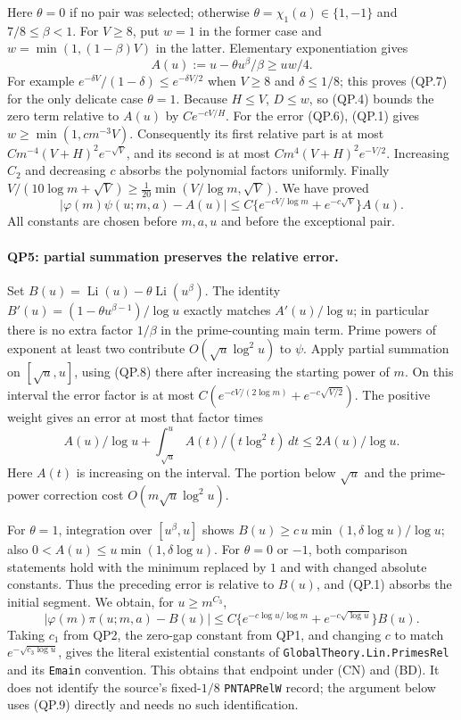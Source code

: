 Here $\theta=0$ if no pair was selected; otherwise
$\theta=\chi_1(a)\in\{1,-1\}$ and $7/8\le\beta<1$.
For $V\ge8$, put $w=1$ in the former case and
$w=\min(1,(1-\beta)V)$ in the latter.  Elementary exponentiation gives
\[
 A(u):=u-\theta u^\beta/\beta\ge uw/4.                \tag{QP.7}
\]
For example $e^{-\delta V}/(1-\delta)\le e^{-\delta V/2}$
when $V\ge8$ and $\delta\le1/8$; this proves (QP.7) for the only delicate
case $\theta=1$.
Because $H\le V$, $D\le w$, so (QP.4) bounds the zero term relative to
$A(u)$ by $Ce^{-cV/H}$.
For the error (QP.6), (QP.1) gives $w\ge\min(1,c m^{-3}V)$.
Consequently its first relative part is at most
$C m^{-4}(V+H)^2e^{-\sqrt V}$, and its second is at most
$C m^4(V+H)^2e^{-V/2}$.  Increasing $C_2$ and decreasing $c$ absorbs
the polynomial factors uniformly.  Finally
$V/(10\log m+\sqrt V)\ge\frac1{20}\min(V/\log m,\sqrt V)$.
We have proved
\[
 |\varphi(m)\psi(u;m,a)-A(u)|
 \le C\{e^{-cV/\log m}+e^{-c\sqrt V}\}A(u).           \tag{QP.8}
\]
All constants are chosen before $m,a,u$ and before the exceptional pair.

\paragraph{QP5: partial summation preserves the relative error.}
Set $B(u)=\operatorname{Li}(u)-\theta\operatorname{Li}(u^\beta)$.
The identity $B'(u)=(1-\theta u^{\beta-1})/\log u$ exactly matches
$A'(u)/\log u$; in particular there is no extra factor $1/\beta$ in
the prime-counting main term.  Prime powers of exponent at least two
contribute $O(\sqrt u\log^2u)$ to $\psi$.
Apply partial summation on $[\sqrt u,u]$, using (QP.8) there after
increasing the starting power of $m$.  On this interval the error factor
is at most $C(e^{-cV/(2\log m)}+e^{-c\sqrt{V/2}})$.
The positive weight gives an error at most that factor times
\[
 A(u)/\log u+\int_{\sqrt u}^{u}A(t)/(t\log^2t)\,dt
                                  \le 2A(u)/\log u.
\]
Here $A(t)$ is increasing on the interval.  The portion below $\sqrt u$
and the prime-power correction cost $O(m\sqrt u\log^2u)$.

For $\theta=1$, integration over $[u^\beta,u]$ shows
$B(u)\ge c\,u\min(1,\delta\log u)/\log u$;
also $0<A(u)\le u\min(1,\delta\log u)$.
For $\theta=0$ or $-1$, both comparison statements hold with the minimum
replaced by $1$ and with changed absolute constants.  Thus the preceding
error is relative to $B(u)$, and (QP.1) absorbs the initial segment.
We obtain, for $u\ge m^{C_3}$,
\[
 |\varphi(m)\pi(u;m,a)-B(u)|
 \le C\{e^{-c\log u/\log m}+e^{-c\sqrt{\log u}}\}B(u).
                                                               \tag{QP.9}
\]
Taking $c_1$ from QP2, the zero-gap constant from QP1, and changing $c$
to match $e^{-\sqrt{c_3\log u}}$, gives the literal existential constants
of \texttt{GlobalTheory.Lin.PrimesRel} and its \texttt{Emain} convention.
This obtains that endpoint under (CN) and (BD).  It does not identify the
source's fixed-$1/8$ \texttt{PNTAPRelW} record; the argument below uses
(QP.9) directly and needs no such identification.

